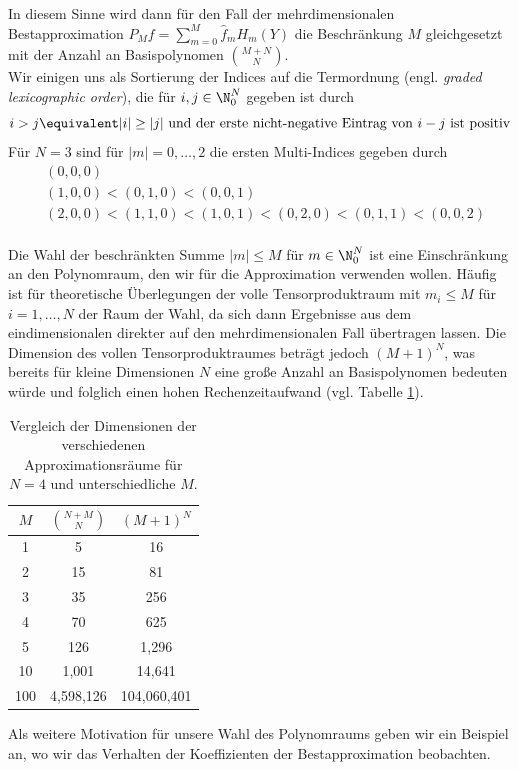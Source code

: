 In diesem Sinne wird dann für den Fall der mehrdimensionalen Bestapproximation $P_Mf=\sum_{m=0}^M\hat{f}_mH_m(Y)$ die Beschränkung $M$ gleichgesetzt mit der Anzahl an Basispolynomen $\binom{M+N}{N}$.\\
Wir einigen uns als Sortierung der Indices auf die Termordnung (engl. \emph{graded lexicographic order}), die für $i,j\in\N_0^N$ gegeben ist durch 
\[i>j \equivalent |i|\ge |j| \text{ und der erste nicht-negative Eintrag von } i-j \text { ist positiv}\]
Für $N=3$ sind für $|m|=0,\dots,2$ die ersten Multi-Indices gegeben durch
\begin{align*}
&(0,0,0)\\
&(1,0,0)<(0,1,0)<(0,0,1)\\
&(2,0,0)<(1,1,0)<(1,0,1)<(0,2,0)<(0,1,1)<(0,0,2)\\
\end{align*}
\begin{mathbem}
Die Wahl der beschränkten Summe $|m|\le M$ für $m\in\N_0^N$ ist eine Einschränkung an den Polynomraum, den wir für die Approximation verwenden wollen. Häufig ist für theoretische Überlegungen der volle Tensorproduktraum mit $m_i\le M$ für $i=1,\dots,N$ der Raum der Wahl, da sich dann Ergebnisse aus dem eindimensionalen direkter auf den mehrdimensionalen Fall übertragen lassen. Die Dimension des vollen Tensorproduktraumes beträgt jedoch $(M+1)^N$, was bereits für kleine Dimensionen $N$ eine große Anzahl an Basispolynomen bedeuten würde und folglich einen hohen Rechenzeitaufwand (vgl. Tabelle \ref{table:poly_space_dim}).
\begin{table}
\centering
\begin{tabular}{c|cc}
$M$ & $\binom{N+M}{N}$ & $(M+1)^N$\\
\hline
1  &  5  &  16 \\
2  &  15  &  81 \\
3  &  35  &  256 \\
4  &  70  &  625 \\
5  &  126  &  1,296 \\
10  &  1,001  &  14,641 \\
100  &  4,598,126  &  104,060,401 
\end{tabular}
\caption{Vergleich der Dimensionen der verschiedenen Approximationsräume für $N=4$ und unterschiedliche $M$.}
\label{table:poly_space_dim}
\end{table}
\end{mathbem}
Als weitere Motivation für unsere Wahl des Polynomraums geben wir ein Beispiel an, wo wir das Verhalten der Koeffizienten der Bestapproximation beobachten.
